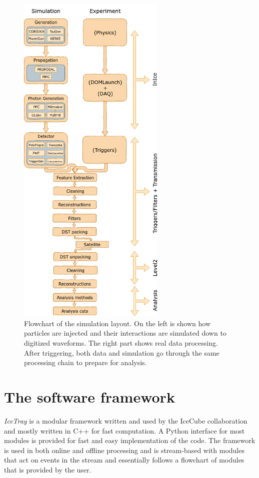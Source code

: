 \begin{figure}
\centering
\includegraphics[width=0.63\textwidth]{chapter6/img/flowchart_extended.png}
\caption{Flowchart of the simulation layout. On the left is shown how particles are injected and their interactions are simulated down to digitized waveforms. The right part shows real data processing. After triggering, both data and simulation go through the same processing chain to prepare for analysis.}
\label{fig:flowchart}
\end{figure}

\section{The software framework}
\textit{IceTray}  is a modular framework written and used by the IceCube collaboration and mostly written in C++ for fast computation. A Python interface for most modules is provided for fast and easy implementation of the code. The framework is used in both online and offline processing and is stream-based with modules that act on events in the stream and essentially follows a flowchart of modules that is provided by the user.\\

